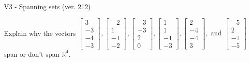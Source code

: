 \begin{exercise}
  \begin{exerciseTitle}V3 - Spanning sets (ver. 212)\end{exerciseTitle}
  \begin{exerciseStatement}
    Explain why the vectors \(\left[\begin{array}{r}
3 \\
-3 \\
-4 \\
-3
\end{array}\right] , \left[\begin{array}{r}
-2 \\
1 \\
-1 \\
-2
\end{array}\right] , \left[\begin{array}{r}
-3 \\
-3 \\
2 \\
0
\end{array}\right] , \left[\begin{array}{r}
1 \\
1 \\
-1 \\
-3
\end{array}\right] , \left[\begin{array}{r}
2 \\
-4 \\
-4 \\
3
\end{array}\right] , \text{ and } \left[\begin{array}{r}
-5 \\
2 \\
-1 \\
-5
\end{array}\right]\) span or don't span \(\mathbb{R}^4\). 
	



\end{exerciseStatement}
\end{exercise}
